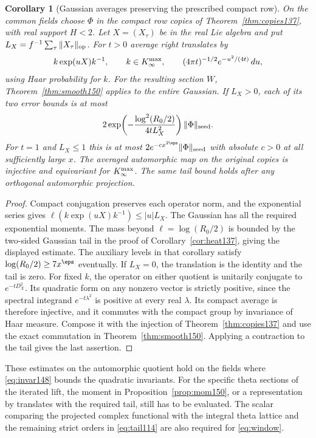 \documentclass[a4paper,11pt]{article}
\newtheorem{corollary}[proposition]{Corollary}
\theoremstyle{definition}
\theoremstyle{remark}
\numberwithin{equation}{section}
\begin{document}
\begin{corollary}[Gaussian averages preserving the prescribed compact row]
\label{cor:gauss150}
On the common fields choose \(\Phi\) in the compact row copies
of Theorem~\ref{thm:copies137}, with real support \(H<2\).
Let \(X=(X_\tau)\) be in the real Lie algebra and put
\(L_X=f^{-1}\sum_\tau\|X_\tau\|_{\rm op}\). For \(t>0\)
average right translates by
\[
          k\exp(uX)k^{-1},\qquad
       k\in K_\infty^{\rm max},\qquad
       (4\pi t)^{-1/2}e^{-u^2/(4t)}\,du ,
\]
using Haar probability for \(k\). For the resulting section
\(W\), Theorem~\ref{thm:smooth150} applies to the entire
Gaussian. If \(L_X>0\), each of its two error bounds is at most
\[
 2\exp\!\left(-\frac{\log^2(R_0/2)}{4tL_X^2}\right)
           \|\Phi\|_{\rm seed}.
\]
For \(t=1\) and \(L_X\le1\) this is at most
\(2e^{-c x^{2\eps}}\|\Phi\|_{\rm seed}\) with absolute
\(c>0\) at all sufficiently large \(x\). The averaged
automorphic map on the original copies is injective and
equivariant for \(K_\infty^{\rm max}\). The same tail bound
holds after any orthogonal automorphic projection.
\end{corollary}
\begin{proof}
Compact conjugation preserves each operator norm, and the
exponential series gives
\(\ell(k\exp(uX)k^{-1})\le |u| L_X\).
The Gaussian has all the required exponential moments.
The mass beyond \(\ell=\log(R_0/2)\) is bounded by the
two-sided Gaussian tail in the proof of
Corollary~\ref{cor:heat137}, giving the displayed estimate.
The auxiliary levels in that corollary satisfy
\(\log(R_0/2)\ge7x^\eps\) eventually. If \(L_X=0\),
the translation is the identity and the tail is zero.
For fixed \(k\), the operator on either quotient is unitarily
conjugate to \(e^{-tD_X^2}\). Its quadratic form on any
nonzero vector is strictly positive, since the spectral
integrand \(e^{-t\lambda^2}\) is positive at every real
\(\lambda\). Its compact average is therefore injective, and
it commutes with the compact group by invariance of Haar
measure. Compose it with the injection of
Theorem~\ref{thm:copies137} and use the exact commutation in
Theorem~\ref{thm:smooth150}. Applying a contraction to the
tail gives the last assertion.
\end{proof}

These estimates on the automorphic quotient hold on the fields
where \eqref{eq:invar148} bounds the quadratic invariants.
For the specific theta sections of the iterated lift, the
moment in Proposition~\ref{prop:mom150}, or a representation
by translates with the required tail, still has to be evaluated.
The scalar comparing the projected complex functional with
the integral theta lattice and the remaining strict orders in
\eqref{eq:tail114} are also required for \eqref{eq:window}.
\end{document}
